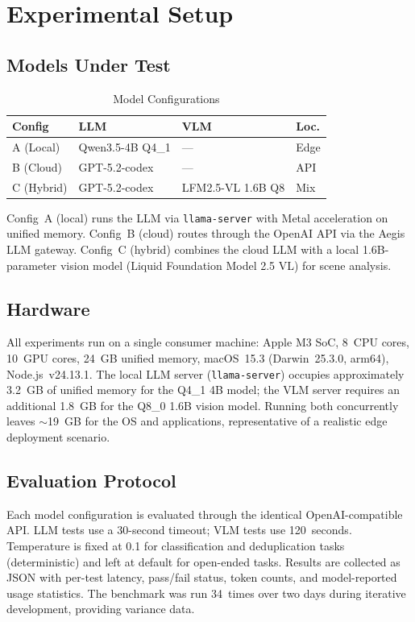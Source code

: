 \documentclass[conference]{IEEEtran}
\begin{document}
\section{Experimental Setup}

\subsection{Models Under Test}

\begin{table}[h]
\centering
\caption{Model Configurations}
\label{tab:models}
\small
\begin{tabular}{p{1.4cm}p{2.0cm}p{2.4cm}l}
\toprule
\textbf{Config} & \textbf{LLM} & \textbf{VLM} & \textbf{Loc.} \\
\midrule
A (Local) & Qwen3.5-4B Q4\_1 & --- & Edge \\
B (Cloud) & GPT-5.2-codex & --- & API \\
C (Hybrid) & GPT-5.2-codex & LFM2.5-VL 1.6B Q8 & Mix \\
\bottomrule
\end{tabular}
\end{table}

Config~A (local) runs the LLM via \texttt{llama-server} with Metal
acceleration on unified memory. Config~B (cloud) routes through the
OpenAI API via the Aegis LLM gateway. Config~C (hybrid) combines the
cloud LLM with a local 1.6B-parameter vision model (Liquid Foundation
Model 2.5 VL) for scene analysis.

\subsection{Hardware}

All experiments run on a single consumer machine:
Apple M3 SoC, 8~CPU cores, 10~GPU cores, 24~GB unified memory,
macOS~15.3 (Darwin~25.3.0, arm64), Node.js~v24.13.1. The local LLM
server (\texttt{llama-server}) occupies approximately 3.2~GB of unified
memory for the Q4\_1 4B model; the VLM server requires an additional
1.8~GB for the Q8\_0 1.6B vision model. Running both concurrently
leaves $\sim$19~GB for the OS and applications, representative of a
realistic edge deployment scenario.

\subsection{Evaluation Protocol}

Each model configuration is evaluated through the identical OpenAI-compatible
API. LLM tests use a 30-second timeout; VLM tests use 120~seconds.
Temperature is fixed at 0.1 for classification and deduplication tasks
(deterministic) and left at default for open-ended tasks. Results are
collected as JSON with per-test latency, pass/fail status, token counts,
and model-reported usage statistics. The benchmark was run 34~times
over two days during iterative development, providing variance data.
\end{document}
